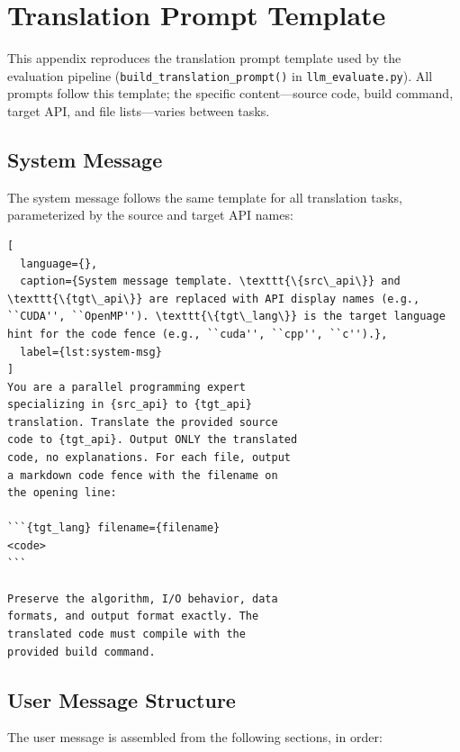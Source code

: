 \section{Translation Prompt Template}
\label{sec:appendix-g}

This appendix reproduces the translation prompt template used by the evaluation pipeline (\texttt{build\_translation\_prompt()} in \texttt{llm\_evaluate.py}). All prompts follow this template; the specific content---source code, build command, target API, and file lists---varies between tasks.

\subsection{System Message}

The system message follows the same template for all translation tasks, parameterized by the source and target API names:

\begin{lstlisting}[
  language={},
  caption={System message template. \texttt{\{src\_api\}} and \texttt{\{tgt\_api\}} are replaced with API display names (e.g., ``CUDA'', ``OpenMP''). \texttt{\{tgt\_lang\}} is the target language hint for the code fence (e.g., ``cuda'', ``cpp'', ``c'').},
  label={lst:system-msg}
]
You are a parallel programming expert
specializing in {src_api} to {tgt_api}
translation. Translate the provided source
code to {tgt_api}. Output ONLY the translated
code, no explanations. For each file, output
a markdown code fence with the filename on
the opening line:

```{tgt_lang} filename={filename}
<code>
```

Preserve the algorithm, I/O behavior, data
formats, and output format exactly. The
translated code must compile with the
provided build command.
\end{lstlisting}

\subsection{User Message Structure}

The user message is assembled from the following sections, in order:

